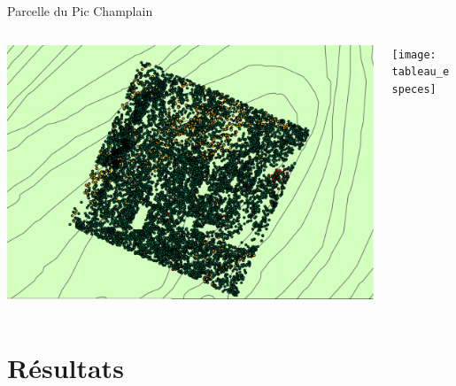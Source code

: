 \documentclass{eecslides}
\begin{document}
	\begin{frame}{Parcelle du Pic Champlain}
		\begin{columns}
			\begin{column}{0.6\textwidth}
				\begin{center}
					\includegraphics[height=0.5\textheight]{carte_arbres}
				\end{center}
			\end{column}
			\begin{column}{0.4\textwidth}
				\begin{center}
					\texttt{[image: tableau\_especes]}
				\end{center}
			\end{column}
		\end{columns}	    	
	\end{frame}

\section{Résultats}
\end{document}
